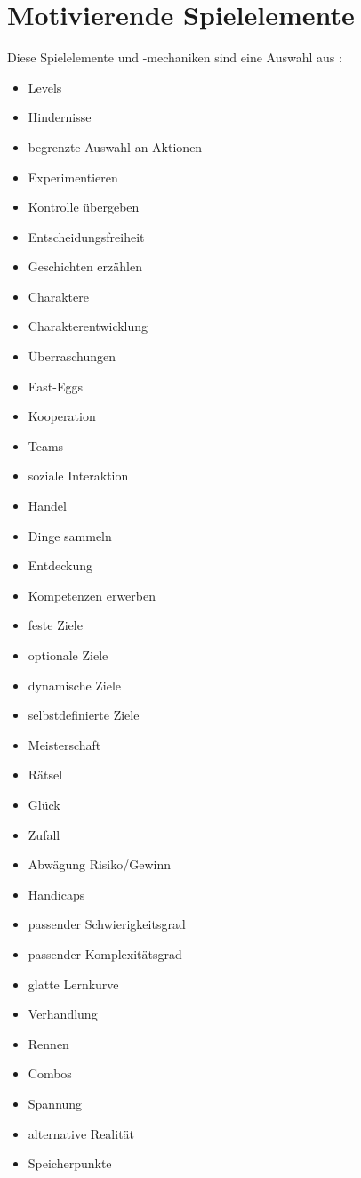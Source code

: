 \section{Motivierende Spielelemente}
\label{spielelemente}

Diese Spielelemente und -mechaniken sind eine Auswahl aus \cite{game-design-patterns}:

\begin{itemize}
  \item Levels
  \item Hindernisse
  \item begrenzte Auswahl an Aktionen
  \item Experimentieren
  \item Kontrolle übergeben
  \item Entscheidungsfreiheit
  \item Geschichten erzählen
  \item Charaktere
  \item Charakterentwicklung
  \item Überraschungen
  \item East-Eggs
  \item Kooperation
  \item Teams
  \item soziale Interaktion
  \item Handel
  \item Dinge sammeln
  \item Entdeckung
  \item Kompetenzen erwerben
  \item feste Ziele
  \item optionale Ziele
  \item dynamische Ziele
  \item selbstdefinierte Ziele
  \item Meisterschaft
  \item Rätsel
  \item Glück
  \item Zufall
  \item Abwägung Risiko/Gewinn
  \item Handicaps
  \item passender Schwierigkeitsgrad
  \item passender Komplexitätsgrad
  \item glatte Lernkurve
  \item Verhandlung
  \item Rennen
  \item Combos
  \item Spannung
  \item alternative Realität
  \item Speicherpunkte
\end{itemize}
